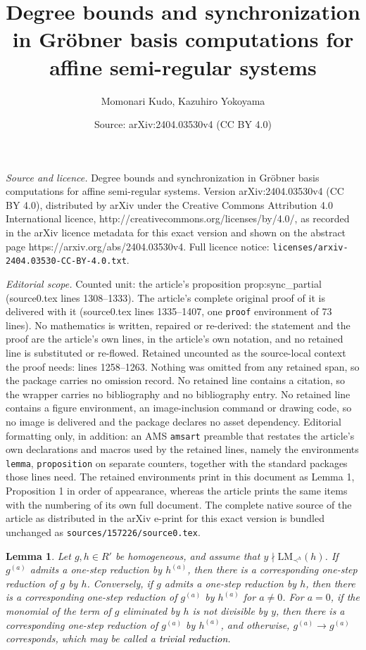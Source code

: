 \documentclass[10pt,a4paper]{amsart}
\title{Degree bounds and synchronization in Gr\"{o}bner basis computations for affine semi-regular systems}
\author{Momonari Kudo, Kazuhiro Yokoyama}
\date{Source: arXiv:2404.03530v4 (CC BY 4.0)}
\newtheorem{lemma}{Lemma}
\begin{document}
\maketitle

\noindent\emph{Source and licence.} Degree bounds and synchronization in Gr\"{o}bner basis computations for affine semi-regular systems. Version arXiv:2404.03530v4 (CC BY 4.0), distributed by arXiv under the Creative Commons Attribution 4.0 International licence, http://creativecommons.org/licenses/by/4.0/, as recorded in the arXiv licence metadata for this exact version and shown on the abstract page https://arxiv.org/abs/2404.03530v4. Full licence notice: \texttt{licenses/arxiv-2404.03530-CC-BY-4.0.txt}.\par\smallskip

\noindent\textit{Editorial scope.} Counted unit: the article's proposition prop:sync\_partial (source0.tex lines 1308--1333). The article's complete original proof of it is delivered with it (source0.tex lines 1335--1407, one \texttt{proof} environment of 73 lines). No mathematics is written, repaired or re-derived: the statement and the proof are the article's own lines, in the article's own notation, and no retained line is substituted or re-flowed.  Retained uncounted as the source-local context the proof needs: lines 1258--1263.  Nothing was omitted from any retained span, so the package carries no omission record.  No retained line contains a citation, so the wrapper carries no bibliography and no bibliography entry.  No retained line contains a figure environment, an image-inclusion command or drawing code, so no image is delivered and the package declares no asset dependency.  Editorial formatting only, in addition: an AMS \texttt{amsart} preamble that restates the article's own declarations and macros used by the retained lines, namely the environments \texttt{lemma}, \texttt{proposition} on separate counters, together with the standard packages those lines need.  The retained environments print in this document as Lemma 1, Proposition 1 in order of appearance, whereas the article prints the same items with the numbering of its own full document.  The complete native source of the article as distributed in the arXiv e-print for this exact version is bundled unchanged as \texttt{sources/157226/source0.tex}.
\begin{lemma}\label{lm:onestepred}
Let $g,h\in R'$ be homogeneous, and assume that $y\nmid \mathrm{LM}_{\prec^h}(h)$.
If $g^{(a)}$ admits a one-step reduction by $h^{(a)}$, then there is a corresponding one-step reduction of $g$ by $h$. 
Conversely, if $g$ admits a one-step reduction by $h$, then there is a corresponding one-step reduction of $g^{(a)}$ by $h^{(a)}$ for $a\not=0$. 
For $a=0$, if the monomial of the term of $g$ eliminated by $h$ is not divisible by $y$, then there is a corresponding one-step reduction of $g^{(a)}$ by $h^{(a)}$, and otherwise, $g^{(a)}\rightarrow g^{(a)}$ corresponds, which may be called a \textcolor{black}{\em trivial reduction}.
\end{lemma}
\end{document}

